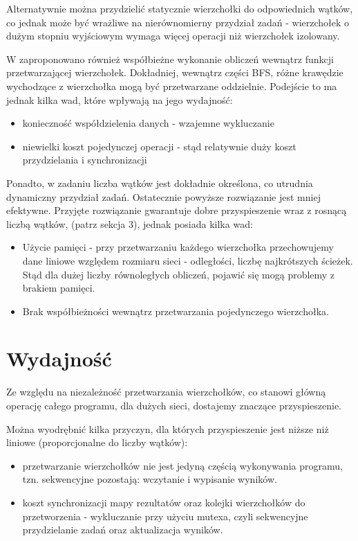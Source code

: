 \documentclass[]{article}
\begin{document}
Alternatywnie można przydzielić statycznie wierzchołki do odpowiednich wątków, co jednak może być wrażliwe na nierównomierny przydział zadań - wierzchołek o dużym stopniu wyjściowym wymaga więcej operacji niż wierzchołek izolowany.

W \parencite[p. 539-550]{bader:06} zaproponowano również współbieżne wykonanie obliczeń wewnątrz funkcji przetwarzającej wierzchołek. Dokładniej, wewnątrz części BFS, różne krawędzie wychodzące z wierzchołka mogą być przetwarzane oddzielnie. Podejście to ma jednak kilka wad, które wpływają na jego wydajność:
\begin{itemize}
\item konieczność współdzielenia danych - wzajemne wykluczanie 
\item niewielki koszt pojedynczej operacji - stąd relatywnie duży koszt przydzielania i synchronizacji
\end{itemize}
Ponadto, w zadaniu liczba wątków jest dokładnie określona, co utrudnia dynamiczny przydział zadań. Ostatecznie powyższe rozwiązanie jest mniej efektywne. \newline
Przyjęte rozwiązanie gwarantuje dobre przyspieszenie wraz z rosnącą liczbą wątków, (patrz sekcja 3), jednak posiada kilka wad:
\begin{itemize}
\item Użycie pamięci - przy przetwarzaniu każdego wierzchołka przechowujemy dane liniowe względem rozmiaru sieci - odległości, liczbę najkrótszych ścieżek. Stąd dla dużej liczby równoległych obliczeń, pojawić się mogą problemy z brakiem pamięci.

\item Brak współbieżności wewnątrz przetwarzania pojedynczego wierzchołka.

\end{itemize}


\section{Wydajność}

Ze względu na niezależność przetwarzania wierzchołków, co stanowi główną operację całego programu, dla dużych sieci, dostajemy znaczące przyspieszenie.

Można wyodrębnić kilka przyczyn, dla których przyspieszenie jest niższe niż liniowe (proporcjonalne do liczby wątków):
\begin{itemize}
\item przetwarzanie wierzchołków nie jest jedyną częścią wykonywania programu, tzn. sekwencyjne pozostają: wczytanie i wypisanie wyników.

\item koszt synchronizacji mapy rezultatów oraz kolejki wierzchołków do przetworzenia - wykluczanie przy użyciu mutexa, czyli sekwencyjne przydzielanie zadań oraz aktualizacja wyników.

\end{itemize}
\end{document}
